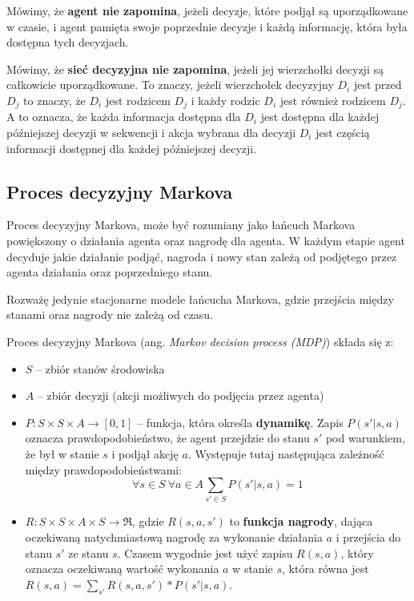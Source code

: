 \documentclass[a4paper, 12pt,oneside]{book}
\begin{document}
Mówimy, że \textbf{agent nie zapomina}, jeżeli decyzje, które podjął są
uporządkowane w czasie, i agent pamięta swoje poprzednie decyzje i każdą
informację, która była dostępna tych decyzjach.

Mówimy, że \textbf{sieć decyzyjna nie zapomina}, jeżeli jej wierzchołki decyzji
są całkowicie uporządkowane. To znaczy, jeżeli wierzchołek decyzyjny $D_i$ jest
przed $D_j$ to znaczy, że $D_i$ jest rodzicem $D_j$ i każdy rodzic $D_i$ jest
również rodzicem $D_j$. A to oznacza, że każda informacja dostępna dla $D_i$
jest dostępna dla każdej późniejszej decyzji w sekwencji i akcja wybrana dla
decyzji $D_i$ jest częścią informacji dostępnej dla każdej późniejszej decyzji.

\subsection{Proces decyzyjny Markova}
Proces decyzyjny Markova, może być rozumiany jako łańcuch Markova powiększony o
działania agenta oraz nagrodę dla agenta. W każdym etapie agent decyduje jakie
działanie podjąć, nagroda i nowy stan zależą od podjętego przez agenta
działania oraz poprzedniego stanu. 

Rozważę jedynie stacjonarne modele łańcucha Markova, gdzie przejścia między
stanami oraz nagrody nie zależą od czasu. 

Proces decyzyjny Markova (ang. \textit{Markov decision process (MDP)}) składa
się z:
\begin{itemize}
		\setlength\itemsep{-0.4em}
	\item $S$ -- zbiór stanów środowiska
	\item $A$ -- zbiór decyzji (akcji możliwych do podjęcia przez agenta)
	\item $P: S\times S\times A\rightarrow [0,1]$ -- funkcja, która określa
		\textbf{dynamikę}. Zapis $P(s' | s, a)$ oznacza
		prawdopodobieństwo, że agent przejdzie do stanu $s'$ pod
		warunkiem, że był w stanie $s$ i podjął akcję $a$. Występuje
		tutaj następująca zależność między prawdopodobieństwami:
		\[\forall s\in S \ \forall a\in A \sum_{s' \in S}P(s'|s,a)=1\]
	\item $R:S\times S\times A\times S \rightarrow \mathfrak{R}$, gdzie
		$R(s,a,s')$ to \textbf{funkcja nagrody}, dająca oczekiwaną
		natychmiastową nagrodę za wykonanie działania $a$ i przejścia
		do stanu $s'$ ze stanu $s$. Czasem wygodnie jest użyć zapisu
		$R(s,a)$, który oznacza oczekiwaną wartość wykonania $a$ w
		stanie $s$, która równa jest
		$R(s,a)=\sum _{s'}R(s,a,s') * P(s'|s,a)$.
\end{itemize}
\end{document}
